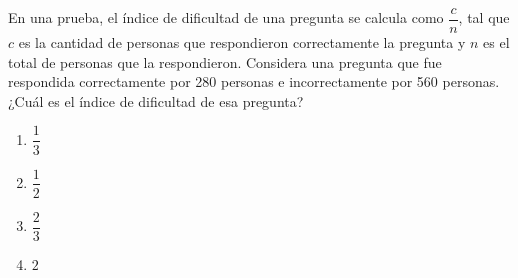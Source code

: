 \begin{problem}
    En una prueba, el índice de dificultad de una pregunta se calcula como $\dfrac{c}{n}$, tal que $c$ es la cantidad de personas que respondieron correctamente la pregunta y $n$ es el total de personas que la respondieron. Considera una pregunta que fue respondida correctamente por 280 personas e incorrectamente por 560 personas. ¿Cuál es el índice de dificultad de esa pregunta?

    \begin{enumerate}[label=\Alph*.]
        \item $\dfrac{1}{3}$
        \item $\dfrac{1}{2}$
        \item $\dfrac{2}{3}$
        \item $2$
    \end{enumerate}
\end{problem}
